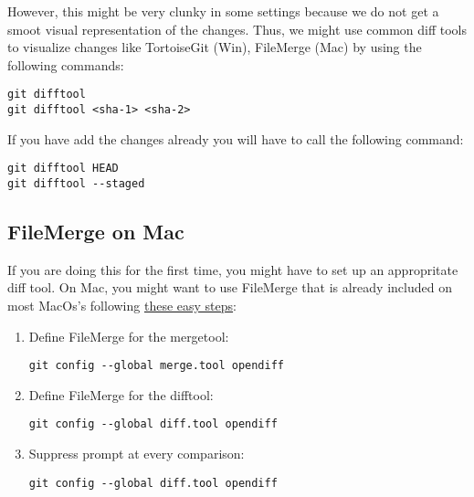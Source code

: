 \documentclass{report}
\begin{document}
However, this might be very clunky in some settings because we do not get a smoot visual representation of the changes. Thus, we might use common diff tools to visualize changes like TortoiseGit (Win), FileMerge (Mac) by using the following commands:
\begin{verbatim}
git difftool
git difftool <sha-1> <sha-2>
\end{verbatim}
If you have add the changes already you will have to call the following command:
\begin{verbatim}
git difftool HEAD
git difftool --staged
\end{verbatim}

\subsection{FileMerge on Mac}
If you are doing this for the first time, you might have to set up an appropritate diff tool.
On Mac, you might want to use FileMerge that is already included on most MacOs's following \href{https://stackoverflow.com/questions/21486481/is-it-possible-to-view-git-diffs-using-a-gui-side-by-side-tool-on-mac}{these easy steps}:
\begin{enumerate}[noitemsep]
    \item Define FileMerge for the mergetool:
    \begin{verbatim}
git config --global merge.tool opendiff
    \end{verbatim}
    \item Define FileMerge for the difftool:
    \begin{verbatim}
git config --global diff.tool opendiff	
    \end{verbatim}		
    \item Suppress prompt at every comparison:
    \begin{verbatim}
git config --global diff.tool opendiff
    \end{verbatim}	
\end{enumerate}
\end{document}
